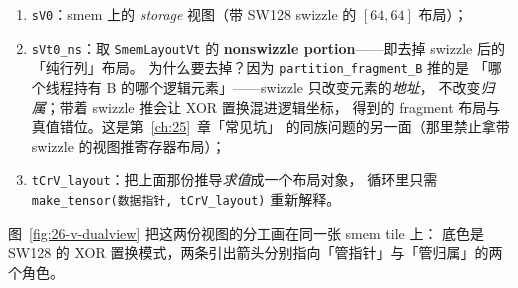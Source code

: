 \begin{enumerate}[itemsep=2pt,topsep=2pt]
  \item \texttt{sV0}：smem 上的 \emph{storage} 视图（带 SW128 swizzle 的
        $[64,64]$ 布局）；
  \item \texttt{sVt0\_ns}：取 \texttt{Smem\allowbreak{}Layout\allowbreak{}Vt} 的
        \textbf{nonswizzle portion}——即去掉 swizzle 后的「纯行列」布局。
        为什么要去掉？因为 \texttt{partition\_\allowbreak{}fragment\_\allowbreak{}B} 推的是
        「哪个线程持有 B 的哪个逻辑元素」——swizzle 只改变元素的\emph{地址}，
        不改变\emph{归属}；带着 swizzle 推会让 XOR 置换混进逻辑坐标，
        得到的 fragment 布局与真值错位。这是第~\ref{ch:25}~章「常见坑」
        的同族问题的另一面（那里禁止拿带 swizzle 的视图推寄存器布局）；
  \item \texttt{tCrV\_layout}：把上面那份推导\emph{求值}成一个布局对象，
        循环里只需 \texttt{make\_\allowbreak{}tensor\allowbreak{}(数据指针,\allowbreak{} t\allowbreak{}Cr\allowbreak{}V\_\allowbreak{}layout)} 重新解释。
\end{enumerate}

图~\ref{fig:26-v-dualview} 把这两份视图的分工画在同一张 smem tile 上：
底色是 SW128 的 XOR 置换模式，两条引出箭头分别指向「管指针」与「管归属」的两个角色。

